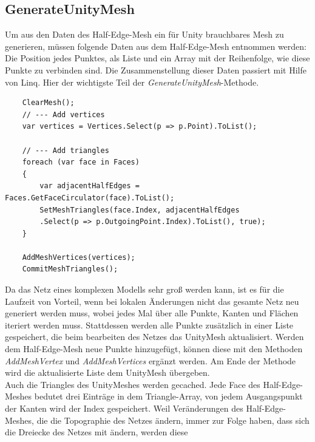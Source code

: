 \subsection{GenerateUnityMesh}
Um aus den Daten des Half-Edge-Mesh ein f\"ur Unity brauchbares Mesh zu generieren, m\"ussen folgende Daten aus dem Half-Edge-Mesh entnommen werden: Die Position jedes Punktes, als Liste und ein Array mit der Reihenfolge, wie diese Punkte zu verbinden sind. Die Zusammenstellung dieser Daten passiert mit Hilfe von Linq. Hier der wichtigste Teil der \textit{GenerateUnityMesh}-Methode.
\begin{lstlisting}
	ClearMesh();
	// --- Add vertices
	var vertices = Vertices.Select(p => p.Point).ToList();

	// --- Add triangles
	foreach (var face in Faces)
	{
		var adjacentHalfEdges = Faces.GetFaceCirculator(face).ToList();
		SetMeshTriangles(face.Index, adjacentHalfEdges
		.Select(p => p.OutgoingPoint.Index).ToList(), true);
	}

	AddMeshVertices(vertices);
	CommitMeshTriangles();
\end{lstlisting}
Da das Netz eines komplexen Modells sehr gro{\ss} werden kann, ist es f\"ur die Laufzeit von Vorteil, wenn bei lokalen \"Anderungen nicht das gesamte Netz neu generiert werden muss, wobei jedes Mal \"uber alle Punkte, Kanten und Fl\"achen iteriert werden muss. Stattdessen werden alle Punkte zus\"atzlich in einer Liste gespeichert, die beim bearbeiten des Netzes das UnityMesh aktualisiert. Werden dem Half-Edge-Mesh neue Punkte hinzugef\"ugt, k\"onnen diese mit den Methoden \textit{AddMeshVertex} und \textit{AddMeshVertices} erg\"anzt werden. Am Ende der Methode wird die aktualisierte Liste dem UnityMesh \"ubergeben. 
\\
Auch die Triangles des UnityMeshes werden gecached. Jede Face des Half-Edge-Meshes bedutet drei Eintr\"age in dem Triangle-Array, von jedem Ausgangspunkt der Kanten wird der Index gespeichert. Weil Ver\"anderungen des Half-Edge-Meshes, die die Topographie des Netzes \"andern, immer zur Folge haben, dass sich die Dreiecke des Netzes mit \"andern, werden diese 